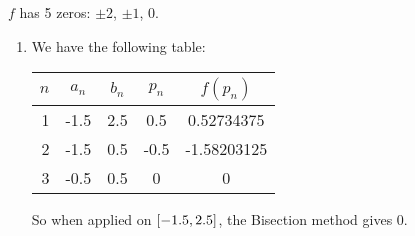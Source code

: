 \documentclass[../../Assignments.tex]{subfiles}
\begin{document}
\begin{solution}
    \(f\) has 5 zeros: \(\pm 2\), \(\pm 1\), \(0\).

    \begin{enumerate}[label = (\alph*)]
        \item We have the following table:


            \begin{table}[H]
                \centering
                \begin{tabular}{r S[table-format=-1.1] S[table-format=1.1] S[table-format=-1.1] S[table-format=-1.8]}
                    \toprule
                    \(n\)  &   {\(a_n\)}   &   {\(b_n\)}   &   {\(p_n\)}   &  {\(f(p_n)\)}  \\
                      &  -1.5         &  2.5          &   0.5         &   0.52734375   \\
                        2  &  -1.5         &  0.5          &  -0.5         &  -1.58203125   \\
                        3  &  -0.5         &  0.5          &   0           &   0            \\
                    \bottomrule
                \end{tabular}
            \end{table}

            So when applied on \(\interval{\num{-1.5}}{\num{2.5}}\), the
            Bisection method gives \(0\).


\end{enumerate}
\end{solution}
\end{document}
